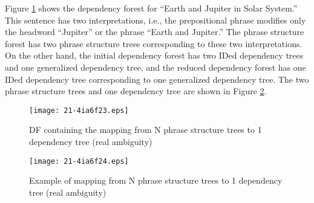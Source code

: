 \documentclass[english]{jnlp_1.4_rep}
\theoremstyle{break}
\theoremstyle{plain}
\theoremstyle{plain}
\begin{document}
Figure \ref{fig:DFContainingNtoOneMappingRealAmbiguity} shows the
dependency forest for ``Earth and Jupiter in Solar System.'' This
sentence has two interpretations, i.e., the prepositional phrase
modifies only the headword ``Jupiter'' or the phrase ``Earth and
Jupiter.'' The phrase structure forest has two phrase structure trees
corresponding to these two interpretations. On the other hand, the
initial dependency forest has two IDed dependency trees and one
generalized dependency tree, and the reduced dependency forest has one
IDed dependency tree corresponding to one generalized dependency
tree. The two phrase structure trees and one dependency tree are shown
in Figure \ref{fig:RealNtoOneMapping}.

\begin{figure}[b]
\begin{center}
\texttt{[image: 21-4ia6f23.eps]}
\end{center}
\caption{DF containing the mapping from N phrase structure trees to 1 dependency tree (real ambiguity)}
\label{fig:DFContainingNtoOneMappingRealAmbiguity}
\end{figure}

\begin{figure}[t]
\begin{center}
\texttt{[image: 21-4ia6f24.eps]}
\end{center}
\caption{Example of mapping from N phrase structure trees to 1 dependency tree (real ambiguity)}
\label{fig:RealNtoOneMapping}
\end{figure}
\end{document}
